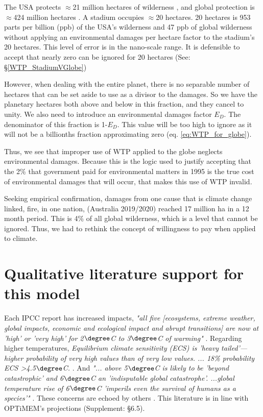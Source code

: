 \documentclass{article}
\begin{document}
The USA protects $\approx$21 million hectares of wilderness \cite{DIETZ2015WorldsLArgestWilderness50years}, and global protection is $\approx$424 million hectares \cite{Eidsvik1989InternationalStatusWilderness}. A stadium occupies $\approx$20 hectares. 20 hectares is 953 parts per billion (ppb) of the USA's wilderness and 47 ppb of global wilderness without applying an environmental damages per hectare factor to the stadium's 20 hectares. This level of error is in the nano-scale range. It is defensible to accept that nearly zero can be ignored for 20 hectares (See: \S\ref{WTP_StadiumVGlobe})

However, when dealing with the entire planet, there is no separable number of hectares that can be set aside to use as a divisor to the damages. So we have the planetary hectares both above and below in this fraction, and they cancel to unity. We also need to introduce an environmental damages factor $E_D$. The denominator of this fraction is 1-$E_D$. This value will be too high to ignore as it will not be a billionths fraction approximating zero (eq. \ref{eq:WTP_for_globe}).

Thus, we see that improper use of  WTP applied to the globe neglects environmental damages. Because this is the logic used to justify accepting that the 2\% that government paid for environmental matters in 1995 is the true cost of environmental damages that will occur, that makes this use of WTP invalid. 

Seeking empirical confirmation, damages from one cause that is climate change linked, fire, in one nation, (Australia 2019/2020) reached 17 million ha in a 12 month period. This is 4\% of all global wilderness, which is a level that cannot be ignored. Thus, we had to rethink the concept of willingness to pay when applied to climate. 

\section{Qualitative literature support for this model}
\label{QualitativeSupport}
 Each IPCC report has increased impacts, \emph{"all five [ecosystems, extreme weather, global impacts, economic and ecological impact and abrupt transitions] are now at 'high' or 'very high' for 2$\degree$C to 3$\degree$C of warming"} \cite[p. 5]{Kemp2022ClimateEndgame}. Regarding higher temperatures, \emph{Equilibrium climate sensitivity (ECS) is 'heavy tailed'---higher probability of very high values than of very low values. ... 18\% probability ECS >4.5$\degree$C.} \cite[p. 2]{Kemp2022ClimateEndgame}. And \emph{"... above 5$\degree$C is likely to be 'beyond catastrophic' and 6$\degree$C an 'indisputable global catastrophe'. ...global temperature rise of 6$\degree$C 'imperils even the survival of humans as a species'"} \cite[pp. 3, 5]{Kemp2022ClimateEndgame}. These concerns are echoed by others \cite{RIPPLE2023RiskyFeedbackClimate}. This literature is in line with OPTiMEM's projections (Supplement: \S6.5). 
\end{document}
